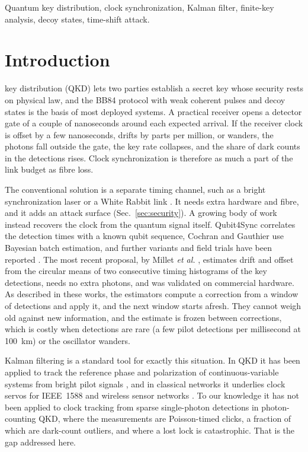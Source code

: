 \documentclass[journal]{IEEEtran}
\theoremstyle{plain}
\begin{document}
\begin{IEEEkeywords}
Quantum key distribution, clock synchronization, Kalman filter, finite-key analysis, decoy states, time-shift attack.
\end{IEEEkeywords}

\section{Introduction}
 key distribution (QKD) lets two parties establish a secret key whose security rests on physical law, and the BB84 protocol \cite{bb84} with weak coherent pulses and decoy states \cite{hwang2003,lo2005,lim2014} is the basis of most deployed systems. A practical receiver opens a detector gate of a couple of nanoseconds around each expected arrival. If the receiver clock is offset by a few nanoseconds, drifts by parts per million, or wanders, the photons fall outside the gate, the key rate collapses, and the share of dark counts in the detections rises. Clock synchronization is therefore as much a part of the link budget as fibre loss.

The conventional solution is a separate timing channel, such as a bright synchronization laser or a White Rabbit link \cite{whiterabbit2011}. It needs extra hardware and fibre, and it adds an attack surface (Sec.~\ref{sec:security}). A growing body of work instead recovers the clock from the quantum signal itself. Qubit4Sync \cite{calderaro2020} correlates the detection times with a known qubit sequence, Cochran and Gauthier \cite{cochran2021} use Bayesian batch estimation, and further variants and field trials have been reported \cite{krause2025,chen2023,guan2025,spiess2023,tiefenthaler2026}. The most recent proposal, by Millet \emph{et al.} \cite{millet2026}, estimates drift and offset from the circular means of two consecutive timing histograms of the key detections, needs no extra photons, and was validated on commercial hardware. %
As described in these works, the estimators compute a correction from a window of detections and apply it, and the next window starts afresh. They cannot weigh old against new information, and the estimate is frozen between corrections, which is costly when detections are rare (a few pilot detections per millisecond at 100~km) or the oscillator wanders.

Kalman filtering is a standard tool for exactly this situation. In QKD it has been applied to track the reference phase and polarization of continuous-variable systems from bright pilot signals \cite{wang2019,huang2020,chin2021,kasthuri2024,ma2022}, and in classical networks it underlies clock servos for IEEE~1588 and wireless sensor networks \cite{hamilton2008,giorgi2011,giorgi2013}. To our knowledge it has not been applied to clock tracking from sparse single-photon detections in photon-counting QKD, where the measurements are Poisson-timed clicks, a fraction of which are dark-count outliers, and where a lost lock is catastrophic. That is the gap addressed here.
\end{document}
